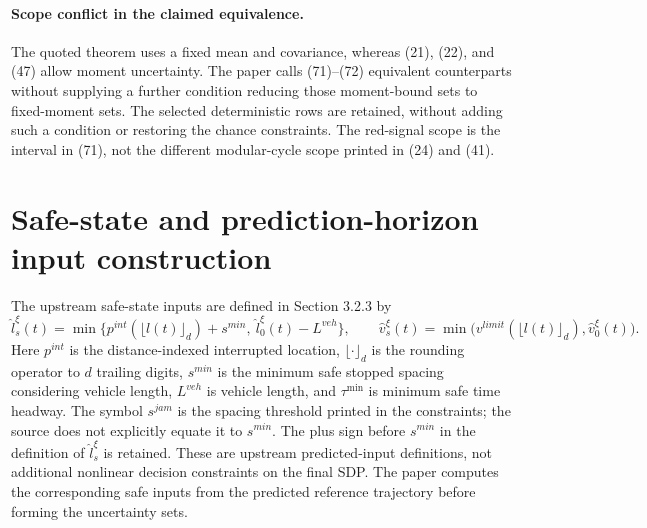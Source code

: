 \documentclass[10pt]{article}
\begin{document}
\paragraph{Scope conflict in the claimed equivalence.}
The quoted theorem uses a fixed mean and covariance, whereas (21), (22), and (47) allow moment uncertainty. The paper calls (71)--(72) equivalent counterparts without supplying a further condition reducing those moment-bound sets to fixed-moment sets. The selected deterministic rows are retained, without adding such a condition or restoring the chance constraints. The red-signal scope is the interval in (71), not the different modular-cycle scope printed in (24) and (41).

\section*{Safe-state and prediction-horizon input construction}
The upstream safe-state inputs are defined in Section 3.2.3 by
\[
\hat l_s^\xi(t)=\min\{p^{int}(\lfloor l(t)\rfloor_d)+s^{min},\ \hat l_0^\xi(t)-L^{veh}\},
\qquad
\hat v_s^\xi(t)=\min\big(v^{limit}(\lfloor l(t)\rfloor_d),\hat v_0^\xi(t)\big).
\]
Here \(p^{int}\) is the distance-indexed interrupted location, \(\lfloor\cdot\rfloor_d\) is the rounding operator to \(d\) trailing digits, \(s^{min}\) is the minimum safe stopped spacing considering vehicle length, \(L^{veh}\) is vehicle length, and \(\tau^{\min}\) is minimum safe time headway. The symbol \(s^{jam}\) is the spacing threshold printed in the constraints; the source does not explicitly equate it to \(s^{min}\). The plus sign before \(s^{min}\) in the definition of \(\hat l_s^\xi\) is retained. These are upstream predicted-input definitions, not additional nonlinear decision constraints on the final SDP. The paper computes the corresponding safe inputs from the predicted reference trajectory before forming the uncertainty sets.
\end{document}
